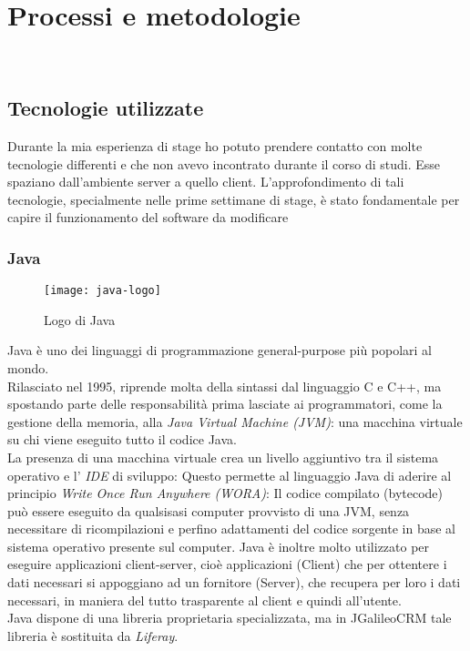 
\chapter{Processi e metodologie}
\label{cap:processi-metodologie}

\\

\section{Tecnologie utilizzate}
Durante la mia esperienza di stage ho potuto prendere contatto con molte tecnologie differenti e che non avevo incontrato durante il corso di studi. Esse spaziano dall'ambiente server a quello client. L'approfondimento di tali tecnologie, specialmente nelle prime settimane di stage, è stato fondamentale per capire il funzionamento del software da modificare \\
\subsection{Java}
\begin{figure}[h]
	\centering
	\texttt{[image: java-logo]}
	\caption{Logo di Java}
\end{figure}
Java è uno dei linguaggi di programmazione general-purpose più popolari al mondo. \\
Rilasciato nel 1995, riprende molta della sintassi dal linguaggio C e C++, ma spostando parte delle responsabilità prima lasciate ai programmatori, come la gestione della memoria, alla \emph{Java Virtual Machine (JVM)}: una macchina virtuale su chi viene eseguito tutto il codice Java.\\
La presenza di una macchina virtuale crea un livello aggiuntivo tra il sistema operativo e l' \emph{IDE} di sviluppo: Questo permette al linguaggio Java di aderire al principio \emph{Write Once Run Anywhere (WORA)}: Il codice compilato (bytecode) può essere eseguito da qualsisasi computer provvisto di una JVM, senza necessitare di ricompilazioni e perfino adattamenti del codice sorgente in base al sistema operativo presente sul computer.
Java è inoltre molto utilizzato per eseguire applicazioni client-server, cioè applicazioni (Client) che per ottentere i dati necessari si appoggiano ad un fornitore (Server), che recupera per loro i dati necessari, in maniera del tutto trasparente al client e quindi all'utente.\\
Java dispone di una libreria proprietaria specializzata, ma in JGalileoCRM tale libreria è sostituita da \emph{Liferay}.\\ %
